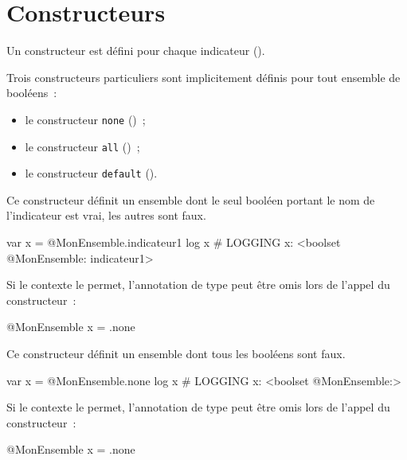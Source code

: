 \section{Constructeurs}

Un constructeur est défini pour chaque indicateur ().

Trois constructeurs particuliers sont implicitement définis pour tout ensemble de booléens~:
\begin{itemize}
  \item le constructeur \texttt{none} ()~;
  \item le constructeur \texttt{all} ()~;
  \item le constructeur \texttt{default} ().
\end{itemize}


Ce constructeur définit un ensemble dont le seul booléen portant le nom de l'indicateur est vrai, les autres sont faux.

\begin{galgas}
var x = @MonEnsemble.indicateur1
log x # LOGGING x: <boolset @MonEnsemble: indicateur1>
\end{galgas}

Si le contexte le permet, l'annotation de type peut être omis lors de l'appel du constructeur~:
\begin{galgas}
@MonEnsemble x = .none
\end{galgas}



Ce constructeur définit un ensemble dont tous les booléens sont faux.

\begin{galgas}
var x = @MonEnsemble.none
log x # LOGGING x: <boolset @MonEnsemble:>
\end{galgas}

Si le contexte le permet, l'annotation de type peut être omis lors de l'appel du constructeur~:
\begin{galgas}
@MonEnsemble x = .none
\end{galgas}



